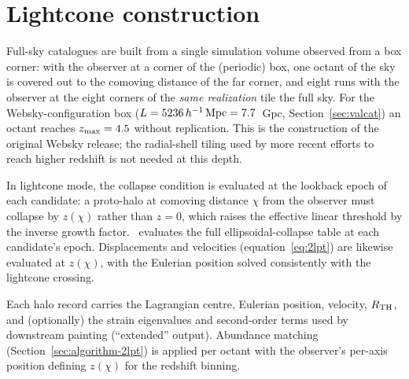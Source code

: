 \section{Lightcone construction}
\label{sec:lightcone}

Full-sky catalogues are built from a single simulation volume observed from a
box corner: with the observer at a corner of the (periodic) box, one octant of
the sky is covered out to the comoving distance of the far corner, and eight
runs with the observer at the eight corners of the \emph{same realization}
tile the full sky. For the Websky-configuration box ($L=5236\,h^{-1}\,\mathrm{Mpc} = 7.7$~Gpc,
Section~\ref{sec:valcat}) an octant reaches $z_{\rm max}=4.5$ without
replication. This is the construction of the original Websky release; the
radial-shell tiling used by more recent efforts to reach higher redshift is
not needed at this depth.

In lightcone mode, the collapse condition is evaluated at the lookback epoch
of each candidate: a proto-halo at comoving distance $\chi$ from the observer
must collapse by $z(\chi)$ rather than $z=0$, which raises the effective
linear threshold by the inverse growth factor. \ppjl\ evaluates the full
ellipsoidal-collapse table at each candidate's epoch. Displacements and
velocities (equation~\ref{eq:2lpt}) are likewise evaluated at $z(\chi)$, with
the Eulerian position solved consistently with the lightcone crossing.

Each halo record carries the Lagrangian centre, Eulerian position, velocity,
$R_{\rm TH}$, and (optionally) the strain eigenvalues and second-order terms
used by downstream painting (``extended'' output). Abundance matching
(Section~\ref{sec:algorithm-2lpt}) is applied per octant with the observer's
per-axis position defining $z(\chi)$ for the redshift binning.
